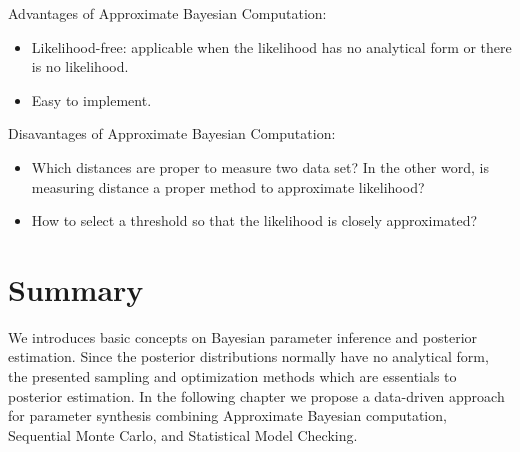 Advantages of Approximate Bayesian Computation:
\begin{itemize}
    \item Likelihood-free: applicable when the likelihood has no analytical form or there is no likelihood.
    \item Easy to implement.
\end{itemize}
Disavantages of Approximate Bayesian Computation:
\begin{itemize}
    \item Which distances are proper to measure two data set? In the other word, is measuring
          distance a proper method to approximate likelihood?
    \item How to select a threshold so that the likelihood is closely approximated?
\end{itemize}

\section{Summary}
We introduces basic concepts on Bayesian parameter inference and posterior estimation. Since the
posterior distributions normally have no analytical form, the presented sampling and
optimization methods which are essentials to posterior estimation. In the following chapter we
propose a data-driven approach for parameter synthesis combining Approximate Bayesian computation,
Sequential Monte Carlo, and Statistical Model Checking.
